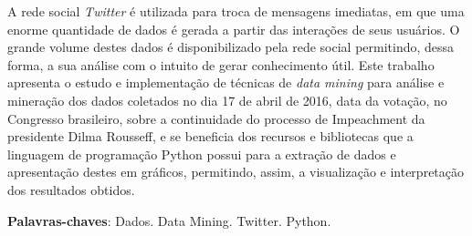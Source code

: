 \begin{resumo}[RESUMO]	
A rede social \textit{Twitter} é utilizada para troca de mensagens imediatas, em que uma enorme quantidade de dados é gerada a partir das interações de seus usuários. O grande volume destes dados é disponibilizado pela rede social permitindo, dessa forma, a sua análise com o intuito de gerar conhecimento útil. Este trabalho apresenta o estudo e implementação de técnicas de \textit{data mining} para análise e mineração dos dados coletados no dia 17 de abril de 2016, data da votação, no Congresso brasileiro, sobre a continuidade do processo de Impeachment da presidente Dilma Rousseff, e se beneficia dos recursos e bibliotecas que a linguagem de programação Python possui para a extração de dados e apresentação  destes em gráficos, permitindo, assim, a visualização e interpretação dos resultados obtidos. 

 \vspace{\onelineskip}
    
 \noindent
 \textbf{Palavras-chaves}: Dados. Data Mining. Twitter. Python.
\end{resumo}
